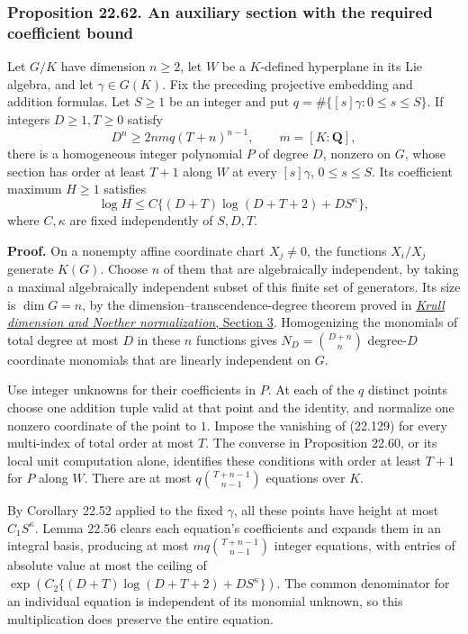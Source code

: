 \documentclass[
  11pt,
  a4paper,
]{article}
\newcounter{none} %
\begin{document}
\subsubsection{Proposition 22.62. An auxiliary section with the required
coefficient
bound}\label{proposition-22.62.-an-auxiliary-section-with-the-required-coefficient-bound}

Let \(G/K\) have dimension \(n\ge2\), let \(W\) be a \(K\)-defined
hyperplane in its Lie algebra, and let \(\gamma\in G(K)\). Fix the
preceding projective embedding and addition formulas. Let \(S\ge1\) be
an integer and put \(q=\#\{[s]\gamma:0\le s\le S\}\). If integers
\(D\ge1,T\ge0\) satisfy \[
 D^n\ge2nmq(T+n)^{n-1},\qquad m=[K:\mathbf Q],
 \tag{22.157}
\] there is a homogeneous integer polynomial \(P\) of degree \(D\),
nonzero on \(G\), whose section has order at least \(T+1\) along \(W\)
at every \([s]\gamma\), \(0\le s\le S\). Its coefficient maximum
\(H\ge1\) satisfies \[
 \log H\le C\{(D+T)\log(D+T+2)+DS^\kappa\},
 \tag{22.158}
\] where \(C,\kappa\) are fixed independently of \(S,D,T\).

\textbf{Proof.} On a nonempty affine coordinate chart \(X_j\ne0\), the
functions \(X_i/X_j\) generate \(K(G)\). Choose \(n\) of them that are
algebraically independent, by taking a maximal algebraically independent
subset of this finite set of generators. Its size is \(\dim G=n\), by
the dimension--transcendence-degree theorem proved in
\href{https://kokunoyumeto.github.io/open-math-courses-public/courses/AG-CA/AG-CA-09.html\#3-normalization-that-respects-ideals}{\emph{Krull
dimension and Noether normalization}, Section 3}. Homogenizing the
monomials of total degree at most \(D\) in these \(n\) functions gives
\(N_D=\binom{D+n}{n}\) degree-\(D\) coordinate monomials that are
linearly independent on \(G\).

Use integer unknowns for their coefficients in \(P\). At each of the
\(q\) distinct points choose one addition tuple valid at that point and
the identity, and normalize one nonzero coordinate of the point to
\(1\). Impose the vanishing of (22.129) for every multi-index of total
order at most \(T\). The converse in Proposition 22.60, or its local
unit computation alone, identifies these conditions with order at least
\(T+1\) for \(P\) along \(W\). There are at most \(q\binom{T+n-1}{n-1}\)
equations over \(K\).

By Corollary 22.52 applied to the fixed \(\gamma\), all these points
have height at most \(C_1 S^\kappa\). Lemma 22.56 clears each equation's
coefficients and expands them in an integral basis, producing at most
\(m q\binom{T+n-1}{n-1}\) integer equations, with entries of absolute
value at most the ceiling of
\(\exp(C_2\{(D+T)\log(D+T+2)+DS^\kappa\})\). The common denominator for
an individual equation is independent of its monomial unknown, so this
multiplication does preserve the entire equation.
\end{document}
